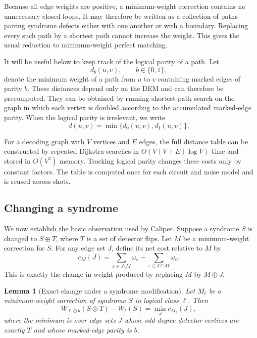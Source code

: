 \documentclass[
    reprint,
    amsmath,amssymb,
    nofootinbib,
    superscriptaddress,
    aps,
    noeprint,
    longbibliography,
    prl
]{revtex4-2}
\theoremstyle{plain}
\newtheorem{lemma}[theorem]{Lemma}
\begin{document}
Because all edge weights are positive, a minimum-weight correction contains no unnecessary closed
loops. It may therefore be written as a collection of paths pairing syndrome defects either with one
another or with a boundary. Replacing every such path by a shortest path cannot increase the weight.
This gives the usual reduction to minimum-weight perfect matching.

It will be useful below to keep track of the logical parity of a path. Let
\begin{equation}
    d_b(u,v),\qquad b\in\{0,1\},
\end{equation}
denote the minimum weight of a path from $u$ to $v$ containing marked edges of parity $b$. These
distances depend only on the DEM and can therefore be precomputed. They can be obtained by running
shortest-path search on the graph in which each vertex is doubled according to the accumulated
marked-edge parity. When the logical parity is irrelevant, we write
\begin{equation}
    d(u,v)=\min\{d_0(u,v),d_1(u,v)\}.
\end{equation}

For a decoding graph with $V$ vertices and $E$ edges, the full distance table can be constructed by repeated Dijkstra searches in $O(V(V + E) \log V)$ time and stored in $O(V^2)$ memory. Tracking logical parity changes these costs only by constant factors. The table is computed once for each circuit and noise model and is reused across shots. 

\subsection{Changing a syndrome}

We now establish the basic observation used by Caliper. Suppose a syndrome $S$ is changed to
$S\oplus T$, where $T$ is a set of detector flips. Let $M$ be a minimum-weight correction for $S$.
For any edge set $J$, define its net cost relative to $M$ by
\begin{equation}
    c_M(J)
    =
    \sum_{\varepsilon\in J\setminus M}\omega_\varepsilon
    -
    \sum_{\varepsilon\in J\cap M}\omega_\varepsilon .
    \label{seq:net-cost}
\end{equation}
This is exactly the change in weight produced by replacing $M$ by $M\oplus J$.

\begin{lemma}[Exact change under a syndrome modification]
    \label{slem:increment}
    Let $M_\ell$ be a minimum-weight correction of syndrome $S$ in logical class $\ell$. Then
    \begin{equation}
        W_{\ell\oplus b}(S\oplus T)-W_\ell(S)
        =
        \min_J c_{M_\ell}(J),
        \label{seq:increment}
    \end{equation}
    where the minimum is over edge sets $J$ whose odd-degree detector vertices are exactly $T$ and
    whose marked-edge parity is $b$.
\end{lemma}
\end{document}
